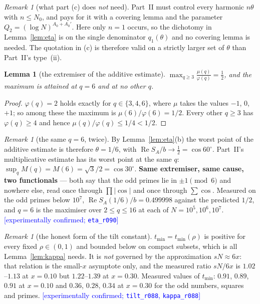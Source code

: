 \documentclass[11pt,a4paper]{article}
\theoremstyle{plain}
\newtheorem{lemma}[theorem]{Lemma}
\theoremstyle{definition}
\theoremstyle{remark}
\newtheorem{remark}[theorem]{Remark}
\newcommand{\STATUS}[1]{\textcolor{blue}{\textsf{[#1]}}}
\begin{document}
\begin{remark}[what part (c) does \emph{not} need]\label{rem:nocover}
Part~II must control every harmonic $n\theta$ with $n\le N_0$, and pays for it with a covering
lemma and the parameter $Q_2=(\log N)^{A_0+A_0'}$. Here only $n=1$ occurs, so the dichotomy in
Lemma~\ref{lem:eta} is on the single denominator $q_1(\theta)$ and no covering lemma is needed.
The quotation in (c) is therefore valid on a strictly larger set of $\theta$ than Part~II's
type~(ii).
\end{remark}

\begin{lemma}[the extremiser of the additive estimate]\label{lem:six}
$\displaystyle\max_{q\ge3}\frac{\mu(q)}{\varphi(q)}=\frac12$, and the maximum is attained at
$q=6$ and at no other $q$.
\end{lemma}

\begin{proof}
$\varphi(q)=2$ holds exactly for $q\in\{3,4,6\}$, where $\mu$ takes the values $-1$, $0$, $+1$;
so among these the maximum is $\mu(6)/\varphi(6)=1/2$. Every other $q\ge3$ has $\varphi(q)\ge4$
and hence $\mu(q)/\varphi(q)\le1/4<1/2$.
\end{proof}

\begin{remark}[the same $q=6$, twice]\label{rem:sixagain}
By Lemma~\ref{lem:eta}(b) the worst point of the additive estimate is therefore $\theta=1/6$,
with $\operatorname{Re}S_A/b\to\tfrac12=\cos60^\circ$. Part~II's multiplicative estimate has its
worst point at the same $q$: $\sup_qM(q)=M(6)=\sqrt3/2=\cos30^\circ$. \textbf{Same extremiser,
same cause, two functionals} --- both say that the odd primes lie in $\pm1\pmod6$ and nowhere
else, read once through $\prod|\cos|$ and once through $\sum\cos$. Measured on the odd primes
below $10^{7}$, $\operatorname{Re}S_A(1/6)/b=0.499998$ against the predicted $1/2$, and $q=6$
is the maximiser over $2\le q\le16$ at each of $N=10^{5},10^{6},10^{7}$.
\STATUS{experimentally confirmed; \texttt{eta\_r090}}
\end{remark}

\begin{remark}[the honest form of the tilt constant]\label{rem:kapparho}
$t_{\min}=t_{\min}(\rho)$ is positive for every fixed $\rho\in(0,1)$ and bounded below on
compact subsets, which is all Lemma~\ref{lem:kappa} needs. It is \emph{not} governed by the
approximation $sN\approx6x$: that relation is the small-$x$ asymptote only, and the measured
ratio $sN/6x$ is $1.02$--$1.13$ at $x=0.10$ but $1.22$--$1.39$ at $x=0.30$. Measured values of
$t_{\min}$: $0.91$, $0.89$, $0.91$ at $x=0.10$ and $0.36$, $0.28$, $0.34$ at $x=0.30$ for the
odd numbers, squares and primes.
\STATUS{experimentally confirmed; \texttt{tilt\_r088}, \texttt{kappa\_r088}}
\end{remark}
\end{document}
